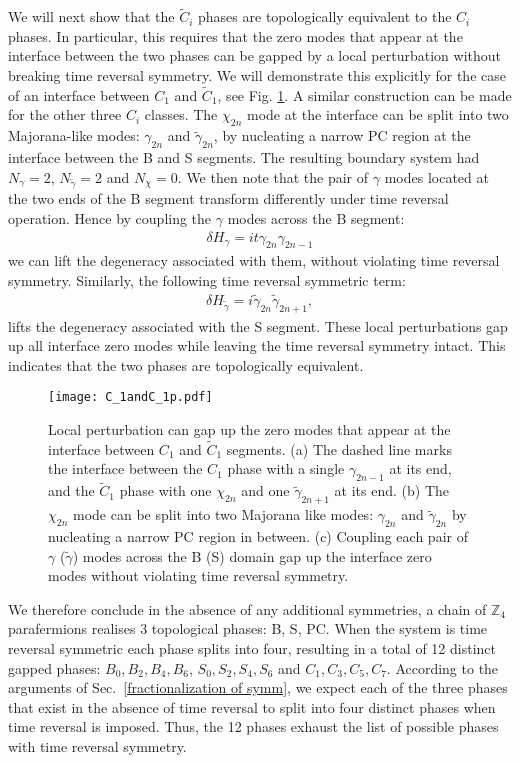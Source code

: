 \documentclass[twocolumn,aps,prb,showpacs]{revtex4-1}
\begin{document}
We will next show that the  $\tilde{C}_i $ phases are topologically equivalent to the $C_i $ phases. In particular, this requires that the zero modes that appear at the interface between the two phases can be gapped  by a local perturbation without breaking  time reversal symmetry. We will demonstrate this explicitly for the case of  an interface between $ C_1$ and $\tilde{C}_1$, see Fig. \ref{C1}. A similar construction can be made for the other three $ C_i$ classes.
The $\chi_{2n} $ mode at the interface can be split into two Majorana-like modes: $\gamma_{2n} $ and $\tilde{\gamma}_{2n} $, by nucleating a narrow PC region at the interface between the B and S segments. The resulting boundary system had $N_{\gamma}=2 $, $N_{\tilde{\gamma}}=2 $ and $ N_{\chi}=0$.  We then note that the pair of $\gamma$ modes located at the two ends of the B segment transform differently under time reversal operation. Hence by coupling the $ \gamma$ modes across the B segment:
\begin{eqnarray}
\delta H_\gamma = i t \gamma_{2n}\gamma_{2n-1}
\end{eqnarray}
we can lift the degeneracy associated with them, without violating time reversal symmetry. Similarly, the following time reversal symmetric term:
\begin{eqnarray}
\delta H_{\tilde{\gamma}} = i\tilde{\gamma}_{2n}\tilde{\gamma}_{2n+1},
\end{eqnarray}
 lifts the degeneracy associated with the S segment. These local perturbations gap up all interface zero modes while leaving the time reversal symmetry intact. This indicates that the  two phases are topologically equivalent.
 \begin{figure}[h]
\texttt{[image: C\_1andC\_1p.pdf]}
\caption{ Local perturbation can gap up the zero modes that appear at the interface between $ C_1$ and $ \tilde{C}_1$ segments. (a) The dashed line marks the interface between the $ C_1$ phase with a single $ \gamma_{2n-1}$ at its end, and  the $ \tilde{C}_1$ phase with one $\chi_{2n} $ and one $ \tilde{\gamma}_{2n+1}$ at its end. (b) The $\chi_{2n} $ mode can be split into two Majorana like modes: $\gamma_{2n} $ and $\tilde{\gamma}_{2n} $ by nucleating a narrow PC region in between. (c) Coupling each pair of $ \gamma$ ($\tilde{\gamma} $) modes across the B (S) domain gap up the interface zero modes without violating time reversal symmetry.}
\label{C1}
\end{figure}

We therefore conclude in the absence of any additional symmetries, a chain of  $ \mathbb{Z}_4$ parafermions realises 3 topological phases: B, S, PC. When the system is time reversal symmetric each phase splits into four, resulting in a total of 12 distinct gapped phases: $B_0,B_2,B_4,B_6 $, $S_0,S_2,S_4,S_6 $ and $C_1,C_3,C_5,C_7 $.  According to the arguments of Sec.~\ref{fractionalization of symm}, we expect each of the three phases that exist in the absence of time reversal to split into four distinct phases when time reversal is imposed. Thus, the 12 phases exhaust the list of possible phases with time reversal symmetry.
\end{document}
